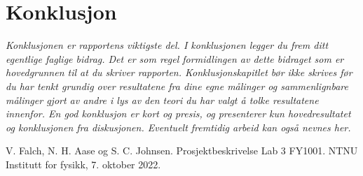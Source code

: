 \documentclass[5p]{elsarticle}
\begin{document}

\section{Konklusjon}
\textit{
Konklusjonen er rapportens viktigste del. 
I konklusjonen legger du frem ditt egentlige faglige bidrag. 
Det er som regel formidlingen av dette bidraget som er hovedgrunnen til at du skriver rapporten. 
Konklusjonskapitlet bør ikke skrives før du har tenkt grundig over resultatene fra dine egne målinger 
og sammenlignbare målinger gjort av andre i lys av den teori du har valgt å tolke resultatene innenfor.
En god konklusjon er kort og presis, og presenterer kun hovedresultatet og konklusjonen fra diskusjonen. 
Eventuelt fremtidig arbeid kan også nevnes her. 
}


\begin{thebibliography}{5}
V. Falch, N. H. Aase og S. C. Johnsen. Prosjektbeskrivelse Lab 3 FY1001. NTNU Institutt for fysikk, 7. oktober 2022.
\end{thebibliography}
\end{document}
